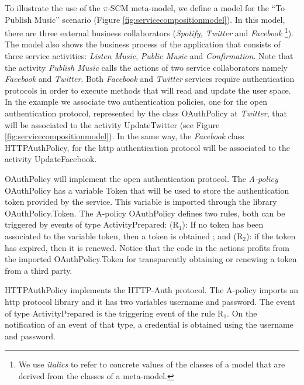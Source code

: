 \begin{example}
To illustrate the use of the $\pi$-SCM meta-model, we define a model for the ``To Publish Music'' scenario (Figure \ref{fig:servicecompositionmodel}). 
In this model, there are three external business collaborators ({\em Spotify, Twitter} and {\em Facebook} \footnote{We use {\em italics} to refer to concrete values of the classes of a model that are derived from the classes of a meta-model.}). 
The model also shows the business process of the application that consists of three service activities: {\em Listen Music}, {\em Public Music} and {\em Confirmation}. 
Note that  the activity {\em Publish Music} calls the actions of two service collaborators namely {\em Facebook} and {\em Twitter}.
Both {\em Facebook} and {\em Twitter} services require authentication protocols in order to execute methods that will read and update the user space. 
In the example we  associate two authentication policies, one for the open authentication protocol, represented by the class {\sf\small OAuthPolicy} at {\em Twitter}, that will be associated to the activity  {\sf\small UpdateTwitter} (see Figure \ref{fig:servicecompositionmodel}). 
In the same way, the {\em Facebook} class {\sf\small HTTPAuthPolicy}, for the http authentication protocol will be associated to the activity {\sf\small UpdateFacebook}.

{\sf\small OAuthPolicy} will implement the open authentication protocol.
The {\em A-policy} {\sf\small OAuthPolicy} has a variable {\sf\small Token} that will be used to store the authentication token provided by the service.
This variable is imported through the library {\sf\small OAuthPolicy.Token}. 
The A-policy {\sf\small OAuthPolicy} defines two rules, both can be triggered by events of type {\sf\small ActivityPrepared}: (R$_1$): If no token has been associated to the variable {\sf\small token}, then a token is obtained ; and (R$_2$): if the token has expired, then it is renewed. 
Notice that the code in the actions profits from the imported {\sf\small OAuthPolicy.Token} for transparently obtaining or renewing a token from a third party.

{\sf\small HTTPAuthPolicy} implements the HTTP-Auth protocol. 
The A-policy imports an http protocol library and it has two variables {\sf\small username} and {\sf\small password}.  
The event of type {\sf\small ActivityPrepared} is the triggering event of the rule {\sf\small R$_1$}. 
On the notification of an event of that type, a credential is obtained using the username and password. 
\hfill\openbox
\end{example}

